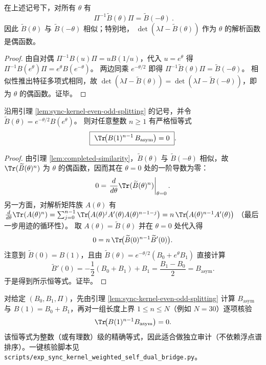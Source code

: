 \begin{lemma}[完成化的自对偶相似]\label{lem:completed-similarity}
在上述记号下，对所有 \(\theta\) 有
\[
\boxed{\ \Pi^{-1}\widetilde B(\theta)\Pi=\widetilde B(-\theta)\ }.
\]
因此 \(\widetilde B(\theta)\) 与 \(\widetilde B(-\theta)\) 相似；特别地，
\(\det(\lambda I-\widetilde B(\theta))\) 作为 \(\theta\) 的解析函数是偶函数。
\end{lemma}
\begin{proof}
由自对偶 \(\Pi^{-1}B(u)\Pi=uB(1/u)\)，代入 \(u=e^{\theta}\) 得
\(
\Pi^{-1}B(e^\theta)\Pi=e^\theta B(e^{-\theta})
\)。
两边同乘 \(e^{-\theta/2}\) 即得
\(
\Pi^{-1}\widetilde B(\theta)\Pi=\widetilde B(-\theta)
\)。
相似性推出特征多项式相同，故 \(\det(\lambda I-\widetilde B(\theta))=\det(\lambda I-\widetilde B(-\theta))\)，即为 \(\theta\) 的偶函数。证毕。
\end{proof}

\begin{lemma}\label{lem:sync-kernel-ward-traces}
沿用引理 \ref{lem:sync-kernel-even-odd-splitting} 的记号，并令
\(
\widetilde B(\theta)=e^{-\theta/2}B(e^{\theta})
\)。
则对任意整数 \(n\ge 1\) 有严格恒等式
\[
\boxed{\ \Tr\!\bigl(B(1)^{n-1}\,B_{\mathrm{asym}}\bigr)=0\ }.
\]
\end{lemma}

\begin{proof}
由引理 \ref{lem:completed-similarity}，\(\widetilde B(\theta)\) 与 \(\widetilde B(-\theta)\) 相似，故
\(
\Tr(\widetilde B(\theta)^n)
\)
为 \(\theta\) 的偶函数，因而其在 \(\theta=0\) 处的一阶导数为零：
\[
0=\left.\frac{d}{d\theta}\Tr(\widetilde B(\theta)^n)\right|_{\theta=0}.
\]
另一方面，对解析矩阵族 \(A(\theta)\) 有
\(
\frac{d}{d\theta}\Tr(A(\theta)^n)
=\sum_{j=0}^{n-1}\Tr\!\bigl(A(\theta)^j A'(\theta)A(\theta)^{n-1-j}\bigr)
=n\,\Tr\!\bigl(A(\theta)^{n-1}A'(\theta)\bigr)
\)
（最后一步用迹的循环性）。
取 \(A(\theta)=\widetilde B(\theta)\) 并在 \(\theta=0\) 处代入得
\[
0=n\,\Tr\!\bigl(\widetilde B(0)^{n-1}\widetilde B'(0)\bigr).
\]
注意到 \(\widetilde B(0)=B(1)\)，且由
\(
\widetilde B(\theta)=e^{-\theta/2}(B_0+e^\theta B_1)
\)
直接计算
\[
\widetilde B'(0)=-\frac12(B_0+B_1)+B_1=\frac{B_1-B_0}{2}=B_{\mathrm{asym}}.
\]
于是得到所示恒等式。证毕。
\end{proof}

\begin{remark}\label{rem:sync-kernel-ward-traces-bridge}
对给定 \((B_0,B_1,\Pi)\)，先由引理 \ref{lem:sync-kernel-even-odd-splitting} 计算 \(B_{\mathrm{asym}}\) 与 \(B(1)=B_0+B_1\)，再对一组长度上界 \(1\le n\le N\)（例如 \(N=30\)）逐项核验
\[
\Tr\!\bigl(B(1)^{n-1}B_{\mathrm{asym}}\bigr)=0.
\]
该恒等式为整数（或有理数）级的精确等式，因此适合做独立审计（不依赖浮点谱排序）。一键核验脚本见 \texttt{scripts/exp\_sync\_kernel\_weighted\_self\_dual\_bridge.py}。
\end{remark}

